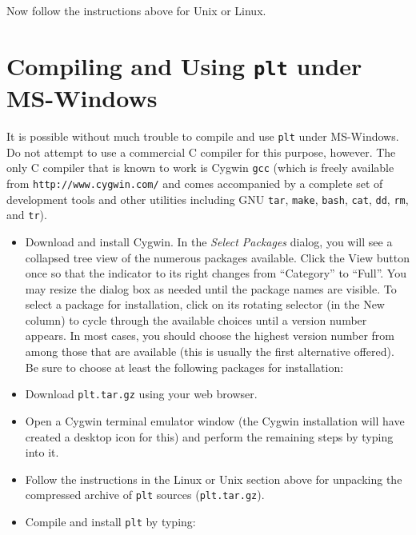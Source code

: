 \documentclass{book}
\begin{document}
Now follow the instructions above for Unix or Linux.

\section{Compiling and Using {\tt plt} under MS-Windows}

It is possible without much trouble to compile and use {\tt plt} under
MS-Windows.  Do not attempt to use a commercial C compiler for this purpose,
however.  The only C compiler that is known to work is Cygwin {\tt gcc}
(which is freely available from {\tt http://www.cygwin.com/}
and comes accompanied by a complete set of development tools and other
utilities including GNU {\tt tar}, {\tt make}, {\tt bash}, {\tt cat},
{\tt dd}, {\tt rm}, and {\tt tr}).

\begin{itemize}
\item
Download and install Cygwin.  In the {\em Select Packages} dialog, you
will see a collapsed tree view of the numerous packages available.  Click the
View button once so that the indicator to its right changes from ``Category''
to ``Full''.  You may resize the dialog box as needed until the package names
are visible.  To select a package for installation, click on its rotating
selector (in the New column) to cycle through the available choices until
a version number appears.  In most cases, you should choose the highest version
number from among those that are available (this is usually the first
alternative offered).  Be sure to choose at least the following packages for
installation:

\item
Download {\tt plt.tar.gz} using your web browser.

\item
Open a Cygwin terminal emulator window (the Cygwin installation will have
created a desktop icon for this) and perform the remaining steps by typing
into it.

\item
Follow the instructions in the Linux or Unix section above for unpacking
the compressed archive of {\tt plt} sources ({\tt plt.tar.gz}).

\item
Compile and install {\tt plt} by typing:
\end{itemize}
\end{document}
